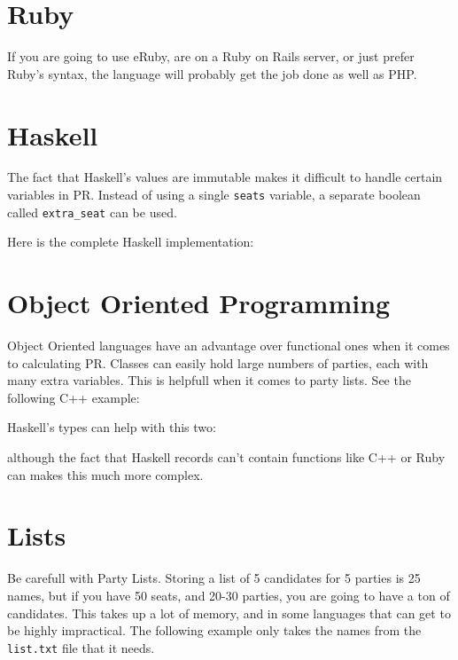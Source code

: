 \documentclass{article}
\begin{document}
    \section{Ruby}

    If you are going to use eRuby, are on a Ruby on Rails server, or just prefer Ruby's syntax, the language will probably get the job done as well as PHP.

    

    \section{Haskell}

    The fact that Haskell's values are immutable makes it difficult to handle certain variables in PR. Instead of using a single \texttt{seats} variable, a separate boolean called \verb|extra_seat| can be used.

    
    
    Here is the complete Haskell implementation:

    

    \section{Object Oriented Programming}

    Object Oriented languages have an advantage over functional ones when it comes to calculating PR. Classes can easily hold large numbers of parties, each with many extra variables. This is helpfull when it comes to party lists. See the following C++ example:

    

    Haskell's types can help with this two:

    

    although the fact that Haskell records can't contain functions like C++ or Ruby can makes this much more complex. 

    \section{Lists}

    Be carefull with Party Lists. Storing a list of 5 candidates for 5 parties is 25 names, but if you have 50 seats, and 20-30 parties, you are going to have a ton of candidates. This takes up a lot of memory, and in some languages that can get to be highly impractical. The following example only takes the names from the \verb|list.txt| file that it needs.
\end{document}
